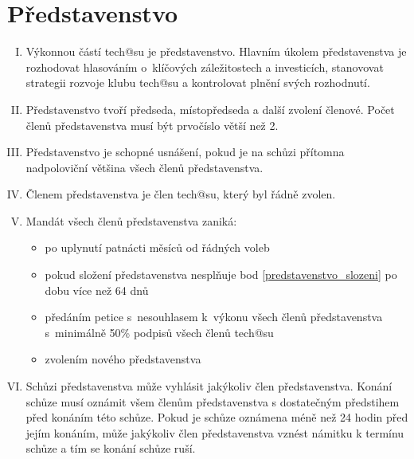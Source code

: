 \documentclass[10pt]{article}
\begin{document}
\section{Představenstvo} %
	\begin{enumerate}[I.]
	\item Výkonnou částí tech@su je představenstvo. Hlavním úkolem představenstva je rozhodovat hlasováním o~klíčových záležitostech a investicích, stanovovat strategii rozvoje klubu tech@su a kontrolovat plnění svých rozhodnutí. 
	\item \label{predstavenstvo_slozeni} Představenstvo tvoří předseda, místopředseda a další zvolení členové. Počet členů představenstva musí být prvočíslo větší než 2.
	\item Představenstvo je schopné usnášení, pokud je na schůzi přítomna nadpoloviční většina všech členů představenstva.
	\item Členem představenstva je člen tech@su, který byl řádně zvolen.
	\item Mandát všech členů představenstva zaniká:
	\begin{itemize}
		\item po uplynutí patnácti měsíců od řádných voleb
		\item pokud složení představenstva nesplňuje bod \ref{predstavenstvo_slozeni} po dobu více než 64 dnů
		\item předáním petice s~nesouhlasem k~výkonu všech členů představenstva s~minimálně 50\% podpisů všech členů tech@su
		\item zvolením nového představenstva
	\end{itemize}

	\item Schůzi představenstva může vyhlásit jakýkoliv člen představenstva. Konání schůze musí oznámit všem členům představenstva s dostatečným předstihem před konáním této schůze. Pokud je schůze oznámena méně než 24 hodin před jejím konáním, může jakýkoliv člen představenstva vznést námitku k termínu schůze a tím se konání schůze ruší.



\end{enumerate}
\end{document}
